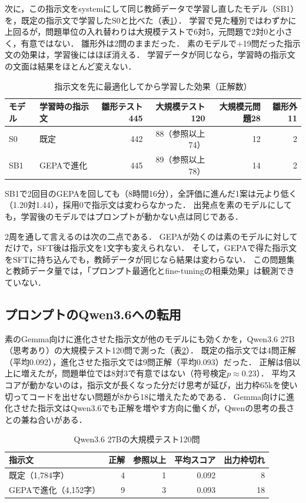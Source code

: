 \documentclass[12pt,a4paper]{article}
\begin{document}
次に，この指示文をsystemにして同じ教師データで学習し直したモデル（SB1）を，既定の指示文で学習したS0と比べた（表\ref{tab:sb1}）．
学習で見た種別ではわずかに上回るが，問題単位の入れ替わりは大規模テストで6対5，元問題で2対0と小さく，有意ではない．
雛形外は2問のままだった．
素のモデルで+19問だった指示文の効果は，学習後にはほぼ消える．
学習データが同じなら，学習時の指示文の文面は結果をほとんど変えない．

\begin{table}[H]
  \centering
  \caption{指示文を先に最適化してから学習した効果（正解数）}
  \label{tab:sb1}
  \small
  \begin{tabular}{llrrrr}
    \toprule
    モデル & 学習時の指示文 & 雛形テスト445 & 大規模テスト120 & 大規模元問題28 & 雛形外11 \\
    \midrule
    S0 & 既定 & 442 & 88（参照以上74） & 12 & 2 \\
    SB1 & GEPAで進化 & 445 & 89（参照以上78） & 14 & 2 \\
    \bottomrule
  \end{tabular}
\end{table}

SB1で2回目のGEPAを回しても（8時間16分），全評価に進んだ1案は元より低く（1.20対1.44），採用0で指示文は変わらなかった．
出発点を素のモデルにしても，学習後のモデルではプロンプトが動かない点は同じである．

2周を通して言えるのは次の二点である．
GEPAが効くのは素のモデルに対してだけで，SFT後は指示文を1文字も変えられない．
そして，GEPAで得た指示文をSFTに持ち込んでも，教師データが同じなら結果は変わらない．
この問題集と教師データ量では，「プロンプト最適化とfine-tuningの相乗効果」は観測できていない．


\subsection{プロンプトのQwen3.6への転用}

素のGemma向けに進化させた指示文が他のモデルにも効くかを，Qwen3.6 27B（思考あり）の大規模テスト120問で測った（表\ref{tab:qwen}）．
既定の指示文では4問正解（平均0.092），進化させた指示文では9問正解（平均0.093）だった．
正解は倍以上に増えたが，問題単位では8対3で有意ではない（符号検定$p \approx 0.23$）．
平均スコアが動かないのは，指示文が長くなった分だけ思考が延び，出力枠65kを使い切ってコードを出せない問題が8から18に増えたためである．
Gemma向けに進化させた指示文はQwen3.6でも正解を増やす方向に働くが，Qwenの思考の長さとの兼ね合いがある．

\begin{table}[H]
  \centering
  \caption{Qwen3.6 27Bの大規模テスト120問}
  \label{tab:qwen}
  \small
  \begin{tabular}{lrrrr}
    \toprule
    指示文 & 正解 & 参照以上 & 平均スコア & 出力枠切れ \\
    \midrule
    既定（1,784字） & 4 & 1 & 0.092 & 8 \\
    GEPAで進化（4,152字） & 9 & 3 & 0.093 & 18 \\
    \bottomrule
  \end{tabular}
\end{table}
\end{document}
